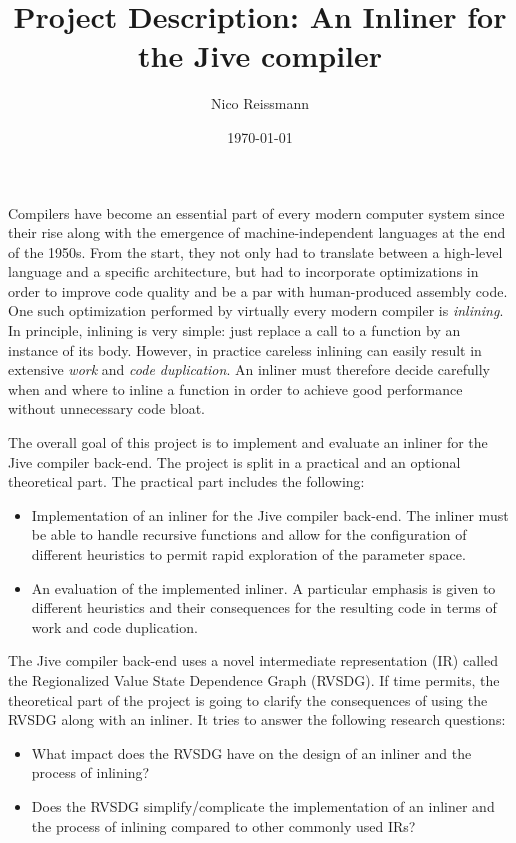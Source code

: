 \documentclass{article}
\title{Project Description: An Inliner for the Jive compiler}
\author{Nico Reissmann}
\date{\today}
\begin{document}
\setlength{\parskip}{1ex}
\setlength{\parindent}{0pt}

\maketitle

Compilers have become an essential part of every modern computer system since their rise along with
the emergence of machine-independent languages at the end of the 1950s. From the start, they not only
had to translate between a high-level language and a specific architecture, but had to incorporate
optimizations in order to improve code quality and be a par with human-produced assembly code. One
such optimization performed by virtually every modern compiler is \textit{inlining}. In principle,
inlining is very simple: just replace a call to a function by an instance of its body. However, in
practice careless inlining can easily result in extensive \textit{work} and \textit{code
duplication}. An inliner must therefore decide carefully when and where to inline a function in
order to achieve good performance without unnecessary code bloat.

The overall goal of this project is to implement and evaluate an inliner for the Jive compiler
back-end. The project is split in a practical and an optional theoretical part. The practical part
includes the following:

\begin{itemize}
	\item Implementation of an inliner for the Jive compiler back-end. The inliner must be able to
	handle recursive functions and allow for the configuration of different heuristics to permit
	rapid exploration of the parameter space.
	\item An evaluation of the implemented inliner. A particular emphasis is given to different
	heuristics and their consequences for the resulting code in terms of work and code duplication.
\end{itemize}

The Jive compiler back-end uses a novel intermediate representation (IR) called the Regionalized
Value State Dependence Graph (RVSDG). If time permits, the theoretical part of the project is going
to clarify the consequences of using the RVSDG along with an inliner. It tries to answer the
following research questions:

\begin{itemize}
	\item What impact does the RVSDG have on the design of an inliner and the process of inlining?
	\item Does the RVSDG simplify/complicate the implementation of an inliner and the process
	of inlining compared to other commonly used IRs?
\end{itemize}
\end{document}
